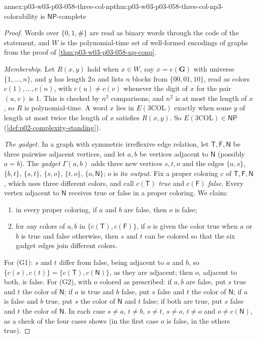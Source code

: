 \begin{annexitem}{annex:p03-w03-p03-058-three-col-np}{thm:p03-w03-p03-058-three-col-np}{3-colorability is \(\mathsf{NP}\)-complete}
\begin{proof}
Words over \(\{0,1,\#\}\) are read as binary words through the code of the
statement, and \(W\) is the polynomial-time set of well-formed encodings of
graphs from the proof of \cref{thm:p03-w03-p03-058-np-conp}.

\emph{Membership.} Let \(R(x,y)\) hold when \(x\in W\), say
\(x=e(\mathbf G)\) with universe \(\{1,\ldots,n\}\), and \(y\) has length
\(2n\) and lists \(n\) blocks from \(\{00,01,10\}\), read as colors
\(c(1),\ldots,c(n)\), with \(c(u)\ne c(v)\) whenever the digit of \(x\) for
the pair \((u,v)\) is \(1\). This is checked by \(n^2\) comparisons, and
\(n^2\) is at most the length of \(x\), so \(R\) is polynomial-time. A word
\(x\) lies in \(E(\mathrm{3COL})\) exactly when some \(y\) of length at most
twice the length of \(x\) satisfies \(R(x,y)\). So
\(E(\mathrm{3COL})\in\mathsf{NP}\) (\cref{def:p02-complexity-standing}).

\emph{The gadget.} In a graph with symmetric irreflexive edge relation,
let \(\mathsf T,\mathsf F,\mathsf N\) be three pairwise adjacent vertices,
and let \(a,b\) be vertices adjacent to \(\mathsf N\) (possibly \(a=b\)).
The \emph{gadget} \(\Gamma(a,b)\) adds three new vertices \(s,t,o\) and the
edges \(\{a,s\}\), \(\{b,t\}\), \(\{s,t\}\), \(\{s,o\}\), \(\{t,o\}\),
\(\{o,\mathsf N\}\); \(o\) is its \emph{output}. Fix a proper coloring \(c\)
of \(\mathsf T,\mathsf F,\mathsf N\), which uses three different colors, and
call \(c(\mathsf T)\) \emph{true} and \(c(\mathsf F)\) \emph{false}. Every
vertex adjacent to \(\mathsf N\) receives true or false in a proper
coloring. We claim:
\begin{enumerate}
\item[(G1)] in every proper coloring, if \(a\) and \(b\) are false, then
      \(o\) is false;
\item[(G2)] for any colors of \(a,b\) in \(\{c(\mathsf T),c(\mathsf F)\}\),
      if \(o\) is given the color true when \(a\) or \(b\) is true and false
      otherwise, then \(s\) and \(t\) can be colored so that the six gadget
      edges join different colors.
\end{enumerate}
For (G1): \(s\) and \(t\) differ from false, being adjacent to \(a\) and
\(b\), so \(\{c(s),c(t)\}=\{c(\mathsf T),c(\mathsf N)\}\), as they are
adjacent; then \(o\), adjacent to both, is false. For (G2), with \(o\) colored
as prescribed: if \(a,b\) are false, put \(s\) true and \(t\) the color of
\(\mathsf N\); if \(a\) is true and \(b\) false, put \(s\) false and \(t\) the
color of \(\mathsf N\); if \(a\) is false and \(b\) true, put \(s\) the color
of \(\mathsf N\) and \(t\) false; if both are true, put \(s\) false and \(t\)
the color of \(\mathsf N\). In each case \(s\ne a\), \(t\ne b\), \(s\ne t\),
\(s\ne o\), \(t\ne o\) and \(o\ne c(\mathsf N)\), as a check of the four
cases shows (in the first case \(o\) is false, in the others true).


\end{proof}
\end{annexitem}

